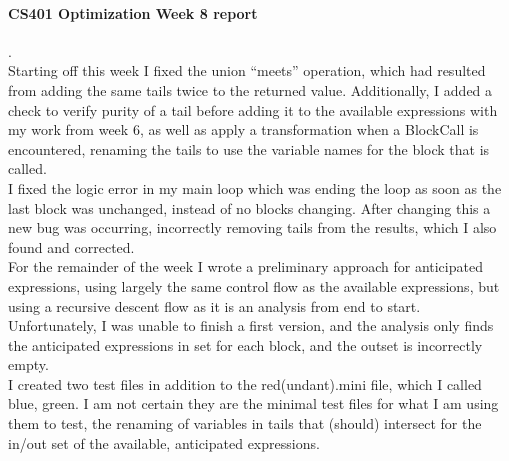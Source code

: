 \documentclass[14pt]{article}
\author{Joel Anna<annajoel@pdx.edu>}
\begin{document}
\paragraph{CS401 Optimization Week 8 report} 
.\\
Starting off this week I fixed the union ``meets'' operation, which had resulted from adding the same tails twice to the returned value. Additionally, I added a check to verify purity of a tail before adding it to the available expressions with my work from week 6, as well as apply a transformation when a BlockCall is encountered, renaming the tails to use the variable names for the block that is called.\\
I fixed the logic error in my main loop which was ending the loop as soon as the last block was unchanged, instead of no blocks changing. After changing this a new bug was occurring, incorrectly removing tails from the results, which I also found and corrected.
\\
For the remainder of the week I wrote a preliminary approach for anticipated expressions, using largely the same control flow as the available expressions, but using a recursive descent flow as it is an analysis from end to start. Unfortunately, I was unable to finish a first version, and the analysis only finds the anticipated expressions in set for each block, and the outset is incorrectly empty.\\
I created two test files in addition to the red(undant).mini file, which I called blue, green. I am not certain they are the minimal test files for what I am using them to test, the renaming of variables in tails that (should) intersect for the in/out set of the available, anticipated expressions.
\end{document}
